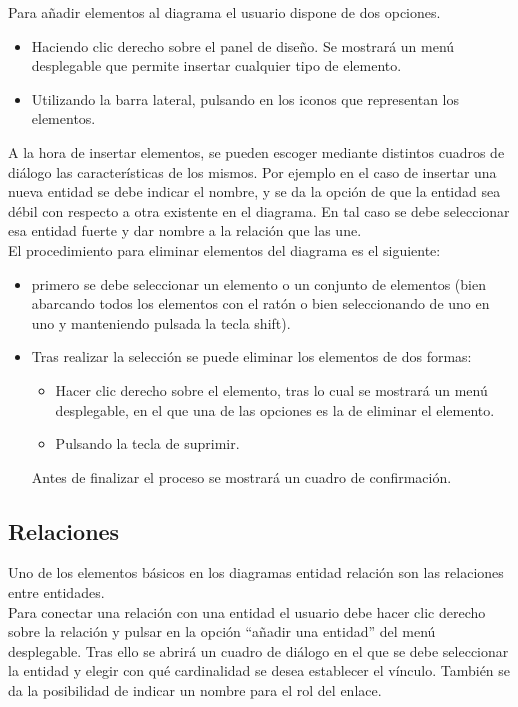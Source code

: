 Para añadir elementos al diagrama el usuario dispone de dos opciones.
\begin{itemize}
    \item Haciendo clic derecho sobre el panel de diseño. Se mostrará un menú desplegable que permite insertar cualquier tipo de elemento.
    \item Utilizando la barra lateral, pulsando en los iconos que representan los elementos.
\end{itemize}
A la hora de insertar elementos, se pueden escoger mediante distintos cuadros de diálogo las características de los mismos. Por ejemplo en el caso de insertar una nueva entidad se debe indicar el nombre, y se da la opción de que la entidad sea débil con respecto a otra existente en el diagrama. En tal caso se debe seleccionar esa entidad fuerte y dar nombre a la relación que las une.\\

El procedimiento para eliminar elementos del diagrama es el siguiente:
\begin{itemize}
    \item primero se debe seleccionar un elemento o un conjunto de elementos (bien abarcando todos los elementos con el ratón o bien seleccionando de uno en uno y manteniendo pulsada la tecla shift).
    \item Tras realizar la selección se puede eliminar los elementos de dos formas:
    \begin{itemize}
        \item Hacer clic derecho sobre el elemento, tras lo cual se mostrará un menú desplegable, en el que una de las opciones es la de eliminar el elemento.
        \item Pulsando la tecla de suprimir.
    \end{itemize}
    Antes de finalizar el proceso se mostrará un cuadro de confirmación.
\end{itemize}

\subsection*{Relaciones}
Uno de los elementos básicos en los diagramas entidad relación son las relaciones entre entidades.\\

Para conectar una relación con una entidad el usuario debe hacer clic derecho sobre la relación y pulsar en la opción \enquote{añadir una entidad} del menú desplegable. Tras ello se abrirá un cuadro de diálogo en el que se debe seleccionar la entidad y elegir con qué cardinalidad se desea establecer el vínculo. También se da la posibilidad de indicar un nombre para el rol del enlace.

